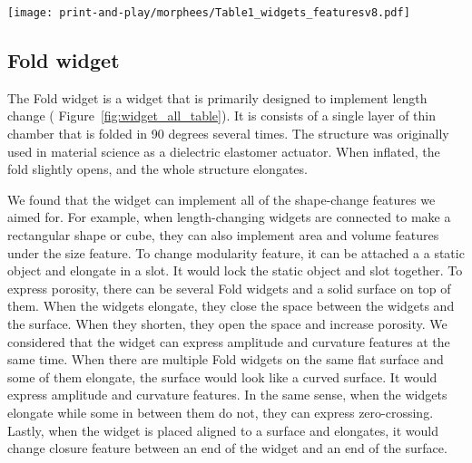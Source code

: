     \begin{figure*}[htb]
      \centering
      \texttt{[image: print-and-play/morphees/Table1\_widgets\_featuresv8.pdf]}
      \caption{Top: Widgets provided by MorpheesPlug. Left: shape-change
        features from literature \cite{Roudaut:2013kz, 10.1145/3173574.3174193}.
        Middle: Illustrations of how the widgets can express the shape-change
        features.}
      \label{fig:widget_all_table}
    \end{figure*}
    
    \subsection{Fold widget}
      The Fold widget is a widget that is primarily designed to implement
      length change ( Figure~\ref{fig:widget_all_table}).  It is consists of a
      single layer of thin chamber that is folded in 90 degrees several times.
      The structure was originally used in material science \cite{Carpi_2007}
      as a dielectric elastomer actuator. When inflated, the fold slightly
      opens, and the whole structure elongates.
        
      We found that the widget can implement all of the shape-change features
      we aimed for. For example, when length-changing widgets are connected to
      make a rectangular shape or cube, they can also implement area and
      volume features under the size feature.  To change modularity feature,
      it can be attached a a static object and elongate in a slot. It would
      lock the static object and slot together.  To express porosity, there
      can be several Fold widgets and a solid surface on top of them. When the
      widgets elongate, they close the space between the widgets and the
      surface. When they shorten, they open the space and increase porosity.
      We considered that the widget can express amplitude and curvature
      features at the same time. When there are multiple Fold widgets on the
      same flat surface and some of them elongate, the surface would look like
      a curved surface. It would express amplitude and curvature features.  In
      the same sense, when the widgets elongate while some in between them do
      not, they can express zero-crossing.  Lastly, when the widget is placed
      aligned to a surface and elongates, it would change closure feature
      between an end of the widget and an end of the surface.
        
